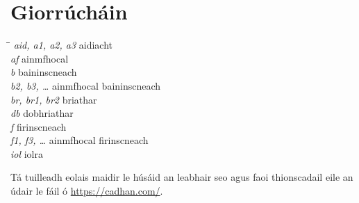 \chapter*{Giorr\'uch\'ain} 
\begin{tabbing}
\hspace*{35ex}\=\hspace{25ex}\=\kill
\> {\it aid, a1, a2, a3} \> aidiacht \\
\> {\it af} \> ainmfhocal \\
\> {\it b} \> baininscneach \\
\> {\it b2, b3, \ldots} \> ainmfhocal baininscneach \\
\> {\it br, br1, br2} \> briathar \\
\> {\it db} \> dobhriathar \\
\> {\it f} \> firinscneach \\
\> {\it f1, f3, \ldots} \> ainmfhocal firinscneach \\
\> {\it iol} \> iolra \\
\end{tabbing}

\vspace{7ex}
T\'a tuilleadh eolais maidir le h\'us\'aid an leabhair seo
agus faoi thionscadail eile an \'udair le f\'ail \'o
\href{https://cadhan.com/}{https://cadhan.com/}.


\endinput
